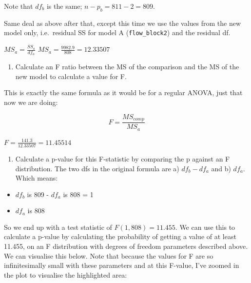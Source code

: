 \documentclass[
]{book}
\providecommand{\tightlist}{%
  \setlength{\itemsep}{0pt}\setlength{\parskip}{0pt}}
\begin{document}
Note that \(df_b\) is the same; \(n - p_b = 811 - 2 = 809\).

Same deal as above after that, except this time we use the values from the new model only, i.e.~residual SS for model A (\texttt{flow\_block2}) and the residual df.

\(MS_a = \frac{SS_{a}}{df_{a}}\)
\(MS_a = \frac{9982.9}{808} = 12.33507\)

\begin{enumerate}
\def\labelenumi{\arabic{enumi}.}
\setcounter{enumi}{4}
\tightlist
\item
  Calculate an F ratio between the MS of the comparison and the MS of the new model to calculate a value for F.
\end{enumerate}

This is exactly the same formula as it would be for a regular ANOVA, just that now we are doing:

\[
F = \frac{MS_{comp}}{MS_{a}}
\]

\(F = \frac{141.3}{12.33507} = 11.45514\)

\begin{enumerate}
\def\labelenumi{\arabic{enumi}.}
\setcounter{enumi}{5}
\tightlist
\item
  Calculate a p-value for this F-statistic by comparing the p against an F distribution. The two dfs in the original formula are a) \(df_b - df_a\) and b) \(df_a\). Which means:
\end{enumerate}

\begin{itemize}
\tightlist
\item
  \(df_b\) is 809 - \(df_a\) is 808 = 1
\item
  \(df_a\) is 808
\end{itemize}

So we end up with a test statistic of \(F(1, 808) = 11.455\). We can use this to calculate a p-value by calculating the probability of getting a value of at least 11.455, on an F distribution with degrees of freedom parameters described above. We can visualise this below. Note that because the values for F are so infinitesimally small with these parameters and at this F-value, I've zoomed in the plot to visualise the highlighted area:
\end{document}
